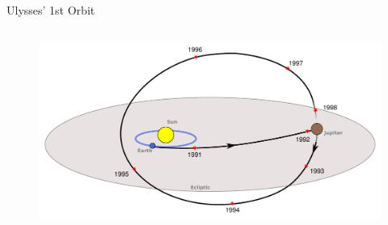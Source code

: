 \documentclass{beamer}
\begin{document}
\begin{frame}{Ulysses' 1st Orbit}
\begin{columns}
	\begin{column}{0.5\textwidth}
		\begin{figure}
			\hspace{-.7cm}									
			\includegraphics[width=1.1\textwidth]{Pics/ulysses_trajectory.pdf}
		\end{figure}
	\end{column}


\end{columns}
\end{frame}
\end{document}

